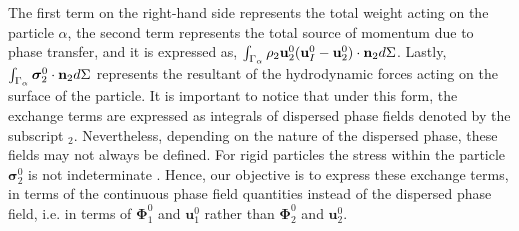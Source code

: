 The first term on the right-hand side represents the total weight acting on the particle $\alpha$, the second term represents the total source of momentum due to phase transfer, and it is expressed as, $\int_{\Gamma_\alpha}  \rho_2 \textbf{u}_2^0 (\textbf{u}_I^0-\textbf{u}_2^0)\cdot\textbf{n}_2  d\Sigma$. 
Lastly, $\int_{\Gamma_\alpha}  \bm{\sigma}_2^0\cdot\textbf{n}_2  d\Sigma$ represents the resultant of the hydrodynamic forces acting on the surface of the particle.
It is important to notice that under this form, the exchange terms are expressed as integrals of dispersed phase fields denoted by the subscript $_2$.
Nevertheless, depending on the nature of the dispersed phase, these fields may not always be defined.
For rigid particles the stress within the particle $\bm{\sigma}_2^0$ is not indeterminate \citep{guazzelli2011}.  
Hence, our objective is to express these exchange terms, in terms of the continuous phase field quantities instead of the dispersed phase field, i.e. in terms of $\mathbf{\Phi}_1^0$ and $\textbf{u}_1^0$ rather than $\mathbf{\Phi}_2^0$ and $\textbf{u}_2^0$. 


